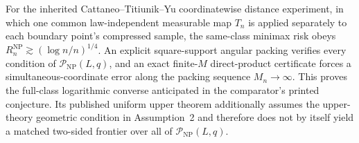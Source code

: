 For the inherited Cattaneo--Titiunik--Yu coordinatewise distance experiment, in which one common law-independent measurable map \(T_n\) is applied separately to each boundary point's compressed sample, the same-class minimax risk obeys \(R_n^{\mathrm{NP}}\gtrsim(\log n/n)^{1/4}\).  An explicit square-support angular packing verifies every condition of \(\mathcal P_{\mathrm{NP}}(L,q)\), and an exact finite-\(M\) direct-product certificate forces a simultaneous-coordinate error along the packing sequence \(M_n\to\infty\).  This proves the full-class logarithmic converse anticipated in the comparator's printed conjecture.  Its published uniform upper theorem additionally assumes the upper-theory geometric condition in Assumption~2 and therefore does not by itself yield a matched two-sided frontier over all of \(\mathcal P_{\mathrm{NP}}(L,q)\).